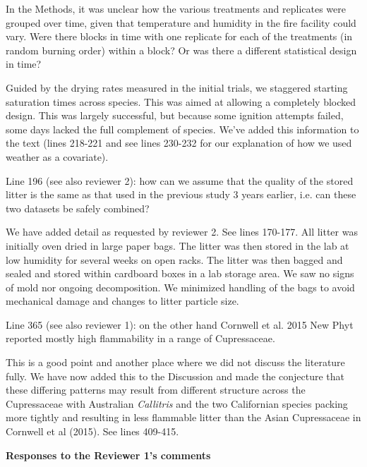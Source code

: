 \documentclass[letterpaper, 12pt]{letter}
\begin{document}
\begin{letter}{}
\begin{quoting}
  In the Methods, it was unclear how the various treatments and replicates were
  grouped over time, given that temperature and humidity in the fire facility
  could vary. Were there blocks in time with one replicate for each of the
  treatments (in random burning order) within a block? Or was there a different
  statistical design in time?
\end{quoting}

Guided by the drying rates measured in the initial trials, we staggered
starting saturation times across species. This was aimed at allowing a
completely blocked design. This was largely successful, but because some
ignition attempts failed, some days lacked the full complement of species.
We've added this information to the text (lines 218-221 and see lines 230-232
for our explanation of how we used weather as a covariate).

\begin{quoting}
  Line 196 (see also reviewer 2): how can we assume that the quality of the
  stored litter is the same as that used in the previous study 3 years earlier,
  i.e. can these two datasets be safely combined?
\end{quoting}

We have added detail as requested by reviewer 2. See lines 170-177. All litter
was initially oven dried in large paper bags. The litter was then stored in the
lab at low humidity for several weeks on open racks. The litter was then bagged
and sealed and stored within cardboard boxes in a lab storage area. We saw no
signs of mold nor ongoing decomposition. We minimized handling of the bags to
avoid mechanical damage and changes to litter particle size.


\begin{quoting}
  Line 365 (see also reviewer 1): on the other hand Cornwell et al. 2015 New
  Phyt reported mostly high flammability in a range of Cupressaceae.
\end{quoting}

This is a good point and another place where we did not discuss the literature
fully. We have now added this to the Discussion and made the conjecture that
these differing patterns may result from different structure across the
Cupressaceae with Australian \emph{Callitris} and the two Californian species
packing more tightly and resulting in less flammable litter than the Asian
Cupressaceae in Cornwell et al (2015). See lines 409-415.


{\bf Responses to the Reviewer 1's comments}


\end{letter}
\end{document}
